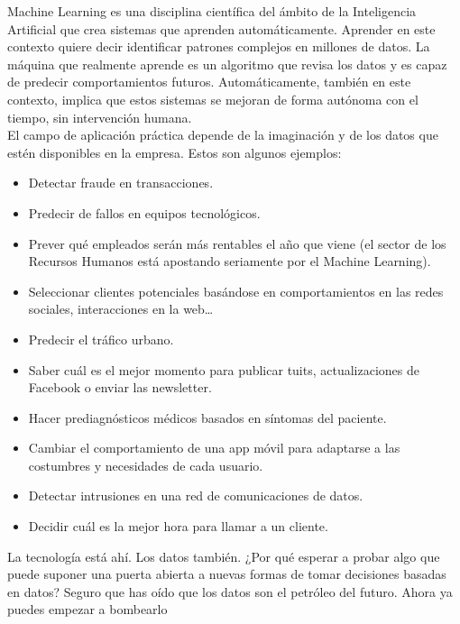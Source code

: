 \documentclass[preprint,12pt]{elsarticle}
\begin{document}
\begin{enumerate}[A)]
			Machine Learning es una disciplina científica del ámbito de la Inteligencia Artificial que crea sistemas que aprenden automáticamente. Aprender en este contexto quiere decir identificar patrones complejos en millones de datos. La máquina que realmente aprende es un algoritmo que revisa los datos y es capaz de predecir comportamientos futuros. Automáticamente, también en este contexto, implica que estos sistemas se mejoran de forma autónoma con el tiempo, sin intervención humana.\cite{bib01:BA:Online} \\
			
			
			El campo de aplicación práctica depende de la imaginación y de los datos que estén disponibles en la empresa. Estos son algunos ejemplos:
			\begin{itemize}
				\item Detectar fraude en transacciones.
				\item Predecir de fallos en equipos tecnológicos.
				\item Prever qué empleados serán más rentables el año que viene (el sector de los Recursos Humanos está apostando seriamente por el Machine Learning).
				\item Seleccionar clientes potenciales basándose en comportamientos en las redes sociales, interacciones en la web…
				\item Predecir el tráfico urbano.
				\item Saber cuál es el mejor momento para publicar tuits, actualizaciones de Facebook o enviar las newsletter.
				\item Hacer prediagnósticos médicos basados en síntomas del paciente.
				\item Cambiar el comportamiento de una app móvil para adaptarse a las costumbres y necesidades de cada usuario.
				\item Detectar intrusiones en una red de comunicaciones de datos.
				\item Decidir cuál es la mejor hora para llamar a un cliente.
				
			\end{itemize}
		
			La tecnología está ahí. Los datos también. ¿Por qué esperar a probar algo que puede suponer una puerta abierta a nuevas formas de tomar decisiones basadas en datos? Seguro que has oído que los datos son el petróleo del futuro. Ahora ya puedes empezar a bombearlo
							
		\end{enumerate}
	
\end{document}
